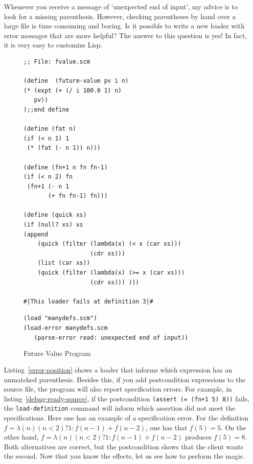 \documentclass[a4paper,12pt]{book}
\newenvironment{fmpage}[1]
           {\begin{lrbox}{\fmbox}\begin{minipage}{#1}}
           {\end{minipage}\end{lrbox}\fbox{\usebox{\fmbox}}}
\begin{document}
Whenever you receive a message
of `unexpected end of input', my advice is to
look for a missing parenthesis.
However, checking parentheses by hand over a large file is
time consuming and boring. Is it possible
to write a new loader with error messages
that are more helpful? The answer to this
question is yes! In fact, it is very easy
to customize Lisp.

\begin{figure}[!h]
\begin{fmpage}{0.8\textwidth}
\begin{verbatim}
;; File: fvalue.scm

(define  (future-value pv i n)
(* (expt (+ (/ i 100.0 1) n) 
   pv))
);;end define

(define (fat n)
(if (< n 1) 1
 (* (fat (- n 1)) n)))

(define (fn+1 n fn fn-1)
(if (< n 2) fn
 (fn+1 (- n 1
       (+ fn fn-1) fn)))

(define (quick xs)
(if (null? xs) xs
(append
    (quick (filter (lambda(x) (< x (car xs)))
                   (cdr xs)))
    (list (car xs))
    (quick (filter (lambda(x) (>= x (car xs)))
                   (cdr xs))) )))

#|This loader fails at definition 3|#
\end{verbatim}
\end{fmpage}

\begin{fmpage}{0.8\textwidth}
\verb|(load "manydefs.scm")|\\
\verb|(load-error manydefs.scm |\\
\verb|   (parse-error read: unexpected end of input))|\\
\end{fmpage}
\caption{Future Value Program}
\label{missing-semiColon}
\end{figure}

Listing~\ref{error-position} shows a loader
that informs which expression has an unmatched
parenthesis. Besides this, if you add postcondition
expressions to the source file, the program
will also report specification errors.
For example, in listing~\ref{debug-ready-source},
if the postcondition
\verb|(assert (= (fn+1 5) 8))| fails,
the \verb|load-definition| command will
inform which assertion did not meet
the specifications. Here one has an
example of a specification error. 
For the definition
$f= \lambda(n) (n<2) ? 1 : f(n-1)+f(n-2)$,
one has that $f(5)= 5$. On  the other hand, 
$f=\lambda(n) (n<2) ? 1 : f(n-1)+f(n-2)$
produces $f(5)= 8$.
Both alternatives are correct, but the postcondition
shows that the client wants the second.
Now that you know the
effects, let us see how to perform the magic.
\end{document}
